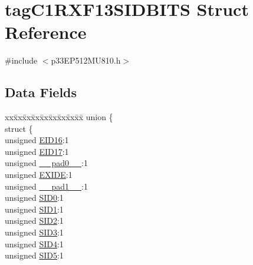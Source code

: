 \hypertarget{structtag_c1_r_x_f13_s_i_d_b_i_t_s}{}\section{tag\+C1\+R\+X\+F13\+S\+I\+D\+B\+I\+TS Struct Reference}
\label{structtag_c1_r_x_f13_s_i_d_b_i_t_s}


{\ttfamily \#include $<$p33\+E\+P512\+M\+U810.\+h$>$}

\subsection*{Data Fields}
\begin{DoxyCompactItemize}
\item 
\begin{tabbing}
xx\=xx\=xx\=xx\=xx\=xx\=xx\=xx\=xx\=\kill
union \{\\
\>struct \{\\
\>\>unsigned \hyperlink{structtag_c1_r_x_f13_s_i_d_b_i_t_s_a6dd5663b0c9838c56db040560ca0efa1}{EID16}:1\\
\>\>unsigned \hyperlink{structtag_c1_r_x_f13_s_i_d_b_i_t_s_aa648615464b0eb29967529333eee9fd9}{EID17}:1\\
\>\>unsigned \hyperlink{structtag_c1_r_x_f13_s_i_d_b_i_t_s_adf71f3d8410c1f1dbbc96680a92c49af}{\_\_pad0\_\_}:1\\
\>\>unsigned \hyperlink{structtag_c1_r_x_f13_s_i_d_b_i_t_s_a09ff1c1be3927220bd3dfbc10edfe243}{EXIDE}:1\\
\>\>unsigned \hyperlink{structtag_c1_r_x_f13_s_i_d_b_i_t_s_acaf2d0924a107ec6e8d2e31febaf66f9}{\_\_pad1\_\_}:1\\
\>\>unsigned \hyperlink{structtag_c1_r_x_f13_s_i_d_b_i_t_s_a1ca276ac15df60e1f7b9a6d0011ade93}{SID0}:1\\
\>\>unsigned \hyperlink{structtag_c1_r_x_f13_s_i_d_b_i_t_s_a3405d354f81391f879648f69f504dfc8}{SID1}:1\\
\>\>unsigned \hyperlink{structtag_c1_r_x_f13_s_i_d_b_i_t_s_ad744966dfc49307f731b7045b01b94e5}{SID2}:1\\
\>\>unsigned \hyperlink{structtag_c1_r_x_f13_s_i_d_b_i_t_s_a9345f3e64720be93e83d8dfc827f3f45}{SID3}:1\\
\>\>unsigned \hyperlink{structtag_c1_r_x_f13_s_i_d_b_i_t_s_aefb106fed4bb40e2c3c71ac612c554e3}{SID4}:1\\
\>\>unsigned \hyperlink{structtag_c1_r_x_f13_s_i_d_b_i_t_s_a0f221b3c9612231686bf87ccdcec8489}{SID5}:1\\

\end{tabbing}
\end{DoxyCompactItemize}
